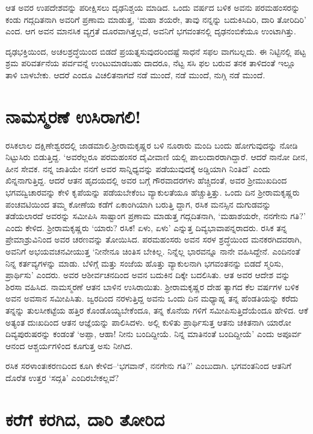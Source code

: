 ಆತ ಅವರ ಉಪದೇಶವನ್ನು ಪರೀಕ್ಷಿಸಲು ದೃಢನಿಶ್ಚಯ ಮಾಡಿದ. ಒಂದು ವರ್ಷದ ಬಳಿಕ ಅವನು ಪರಮಹಂಸರನ್ನು ಕಂಡು ಗದ್ಗದಿತನಾಗಿ ಅವರಿಗೆ ಪ್ರಣಾಮ ಮಾಡುತ್ತ, ‘ಮಹಾ ಶಯರೇ, ತಾವು ನನ್ನನ್ನು ಬದುಕಿಸಿದಿರಿ, ದಾರಿ ತೋರಿದಿರಿ’ ಎಂದ. ಆಗ ಅವನ ಮಾನಸಿಕ ವ್ಯಗ್ರತೆ ದೂರವಾಗಿತ್ತಲ್ಲದೆ, ಅವನಿಗೆ ಭಗವಂತನಲ್ಲಿ ದೃಢನಂಬಿಕೆಯೂ ಉಂಟಾಗಿತ್ತು.

ದೃಢಭಕ್ತಿಯಿಂದ, ಅಚಲಶ್ರದ್ಧೆಯಿಂದ ಬಿಡದೆ ಪ್ರಯತ್ನಸುವುದರಿಂದಷ್ಟೆ ಸಾಧನೆ ಸಫಲ ವಾಗಬಲ್ಲದು. ಈ ನಿಟ್ಟಿನಲ್ಲಿ ಪಟ್ಟ ಶ್ರಮ ಪರಿವರ್ತನೆಯ ಪರ್ವವನ್ನೆ ಉಂಟುಮಾಡಬಹು ದಾದರೂ, ನೆಟ್ಟ ಸಸಿ ಫಲ ಬರುವ ತನಕ ತಾಳಿದಂತೆ ಇಲ್ಲೂ ತಾಳಿ ಬಾಳಬೇಕು. ಆದರೆ ಎಂದೂ ವಿಚಲಿತನಾಗದೆ ನಡೆ ಮುಂದೆ, ನಡೆ ಮುಂದೆ, ನುಗ್ಗಿ ನಡೆ ಮುಂದೆ.


\section{ನಾಮಸ್ಮರಣೆ ಉಸಿರಾಗಲಿ!}

ರಸಿಕಲಾಲ ದಕ್ಷಿಣೇಶ್ವರದಲ್ಲಿ ಜಾಡಮಾಲಿ.ಶ‍್ರೀರಾಮಕೃಷ್ಣರ ಬಳಿ ನೂರಾರು ಮಂದಿ ಬಂದು ಹೋಗುವುದನ್ನು ನೋಡಿ ನಿಟ್ಟುಸಿರು ಬಿಡುತ್ತಿದ್ದ. ‘ಅವರೆಲ್ಲರೂ ಪರಮಹಂಸರ ದೈವೀವಾಣಿ ಯಲ್ಲಿ ಪಾಲುದಾರರಾಗಿದ್ದಾರೆ. ಆದರೆ ನಾನೋ ದೀನ, ಹೀನ ಸೇವಕ. ನನ್ನ ಜಾತಿಯೇ ನನಗೆ ಅವರ ಸಾನ್ನಿಧ್ಯವನ್ನು ಪಡೆಯುವುದಕ್ಕೆ ಅಡ್ಡಿಯಾಗಿ ನಿಂತಿದೆ’ ಎಂದು ಖಿನ್ನನಾಗುತ್ತಿದ್ದ. ಆದರೆ ಆತನ ಹೃದಯದಲ್ಲಿ ಅವರ ಬಗ್ಗೆ ಗೌರವಾದರಗಳು ಹೆಚ್ಚಿದಂತೆ, ಅವರ ಶ‍್ರೀಮುಖದಿಂದ ಭಗವದ್ವಿಚಾರವನ್ನು ಕೇಳಿ ಕೃಪೆಯನ್ನು ಪಡೆಯಬೇಕೆಂಬ ವ್ಯಾಕುಲತೆಯೂ ಹೆಚ್ಚುತ್ತಿತ್ತು. ಒಂದು ದಿನ ಶ‍್ರೀರಾಮಕೃಷ್ಣರು ಪಂಚವಟಿಯಿಂದ ತಮ್ಮ ಕೋಣೆಯ ಕಡೆಗೆ ಏಕಾಂಗಿಯಾಗಿ ಬರುತ್ತಿ ದ್ದಾಗ, ರಸಿಕ ಮನಸ್ಸಿನ ದುಗುಡವನ್ನು ತಡೆಯಲಾರದೆ ಅವರನ್ನು ಸಮೀಪಿಸಿ ಸಾಷ್ಟಾಂಗ ಪ್ರಣಾಮ ಮಾಡುತ್ತ ಗದ್ಗದಿತನಾಗಿ, ‘ಮಹಾಶಯರೇ, ನನಗೇನು ಗತಿ?’ ಎಂದು ಕೇಳಿದ. ಶ‍್ರೀರಾಮಕೃಷ್ಣರು ‘ಯಾರು? ರಸಿಕ! ಏಳು, ಏಳು’ ಎನ್ನುತ್ತ ದಿವ್ಯಭಾವಾಪನ್ನರಾದರು. ರಸಿಕ ತನ್ನ ಪ್ರೇಮಾಶ್ರುವಿನಿಂದ ಅವರ ಚರಣವನ್ನು ತೋಯಿಸಿದ. ಪರಮಹಂಸರು ಅವನ ಸರಳ ಶ್ರದ್ಧೆಯಿಂದ ಮನಕರಗಿದವರಾಗಿ, ಅವನಿಗೆ ಅಭಯವಚನವೀಯುತ್ತ ‘ನೀನೇನೂ ಚಿಂತಿಸ ಬೇಕಿಲ್ಲ. ನಿನ್ನೆಲ್ಲ ಭಾರವನ್ನೂ ನಾನೇ ವಹಿಸಿದ್ದೇನೆ. ಎಂದಿನಂತೆ ನಿನ್ನ ಕರ್ತವ್ಯಗಳನ್ನು ಮಾಡು. ಬೆಳಿಗ್ಗೆ ಮತ್ತು ಸಂಜೆಯ ಹೊತ್ತು ವ್ಯಾಕುಲನಾಗಿ ಭಗವಂತನನ್ನು ಬಿಡದೆ ಸ್ಮರಿಸು, ಪ್ರಾರ್ಥಿಸು’ ಎಂದರು. ಅವರ ಆಶೀರ್ವಚನದಿಂದ ಅವನ ಬದುಕಿನ ದಿಕ್ಕೇ ಬದಲಿಸಿತು. ಆತ ಅವರ ಆದೇಶ ವನ್ನು ಶಿರಸಾ ವಹಿಸಿದ. ನಾಮಸ್ಮರಣೆ ಆತನ ಬಾಳಿನ ಉಸಿರಾಯಿತು. ಶ‍್ರೀರಾಮಕೃಷ್ಣರ ದೇಹ ತ್ಯಾಗದ ಕೆಲ ವರ್ಷಗಳ ಬಳಿಕ ಅವನ ಅವಸಾನ ಸಮೀಪಿಸಿತು. ಜ್ವರದಿಂದ ನರಳುತ್ತಿದ್ದ ಅವನು ಒಂದು ದಿನ ಮಧ್ಯಾಹ್ನ ತನ್ನ ಹೆಂಡತಿಯನ್ನು ಕರೆದು ತನ್ನನ್ನು ತುಲಸೀಕಟ್ಟೆಯ ಹತ್ತಿರ ಕೊಂಡೊಯ್ಯಬೇಕೆಂದೂ, ತನ್ನ ಕೊನೆಯ ಗಳಿಗೆ ಸಮೀಪಿಸುತ್ತಿದೆಯೆಂದೂ ಹೇಳಿದ. ಆಕೆ ಅತ್ಯಂತ ದುಃಖದಿಂದ ಆತನ ಆಜ್ಞೆಯನ್ನು ಪಾಲಿಸಿದಳು. ಅಲ್ಲಿ ಕುಳಿತು ಪ್ರಾರ್ಥಿಸುತ್ತ ಆತನು ಚಕಿತನಾಗಿ ಯಾರೋ ದಿವ್ಯಪುರುಷರನ್ನು ಕಂಡಂತೆ ‘ಅಪ್ಪಾ, ಆಹಾ! ನೀನು ಬಂದಿದ್ದೀಯೆ. ನಿನ್ನ ಮಾತಿನಂತೆ ಬಂದಿದ್ದೀಯೆ’ ಎಂದು ಅಪೂರ್ವ ಆನಂದ ಆಶ್ಚರ್ಯಗಳಿಂದ ಕೂಗುತ್ತ ಅಸು ನೀಗಿದ.

ರಸಿಕ ಸರಳಾಂತಃಕರಣದಿಂದ ಕೂಗಿ ಕೇಳಿದ–‘ಭಗವಾನ್, ನನಗೇನು ಗತಿ?’ ಎಂಬುದಾಗಿ. ಭಗವಂತನಿಂದ ಆತನಿಗೆ ದೊರೆತ ಉತ್ತರ ‘ಸದ್ಗತಿ’ ಎಂದಿರಬೇಕಲ್ಲವೆ?


\section{ಕರೆಗೆ ಕರಗಿದ, ದಾರಿ ತೋರಿದ}

